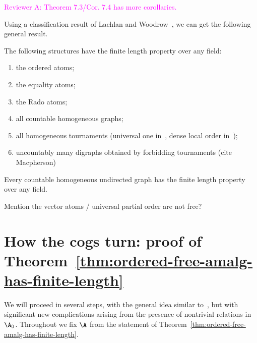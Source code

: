 \textcolor{magenta}{Reviewer A: Theorem 7.3/Cor. 7.4 has more corollaries.}

Using a classification result of Lachlan and Woodrow~\cite{LachlanWoodrow_80}, we can get the following general result.

\begin{corollary}\label{cor:lachlan-woodrow}
    The following structures have the finite length property over any field:
    \color{magenta}
    \begin{enumerate}
        \item the ordered atoms;
        \item the equality atoms;
        \item the Rado atoms;
        \item all countable homogeneous graphs;
        \item all homogeneous tournaments (universal one in~\cite{BPP15}, dense local order in~\cite{NguyenVanThe13});
        \item uncountably many digraphs obtained by forbidding tournaments (cite Macpherson)
    \end{enumerate}
    Every countable homogeneous undirected graph has the finite length property over any field.

    Mention the vector atoms / universal partial order are not free?
\end{corollary}




\section{How the cogs turn: proof of Theorem~\ref{thm:ordered-free-amalg-has-finite-length}}\label{sec:cogs-turn}
We will proceed in several steps, with the general idea similar to~\cite[Sec.~4.1]{BFKM24}, but with significant new complications arising from the presence of nontrivial relations in $\A_0$.
Throughout we fix $\A$ from the statement of Theorem~\ref{thm:ordered-free-amalg-has-finite-length}.


